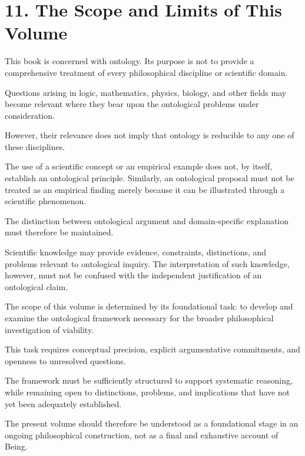 
\section*{11. The Scope and Limits of This Volume}

This book is concerned with ontology. Its purpose
is not to provide a comprehensive treatment
of every philosophical discipline or scientific
domain.

Questions arising in logic, mathematics, physics,
biology, and other fields may become relevant
where they bear upon the ontological problems
under consideration.

However, their relevance does not imply that
ontology is reducible to any one of these
disciplines.

The use of a scientific concept or an empirical
example does not, by itself, establish an
ontological principle. Similarly, an ontological
proposal must not be treated as an empirical
finding merely because it can be illustrated
through a scientific phenomenon.

The distinction between ontological argument
and domain-specific explanation must therefore
be maintained.

Scientific knowledge may provide evidence,
constraints, distinctions, and problems relevant
to ontological inquiry. The interpretation of
such knowledge, however, must not be confused
with the independent justification of an
ontological claim.

The scope of this volume is determined by
its foundational task: to develop and examine
the ontological framework necessary for the
broader philosophical investigation of viability.

This task requires conceptual precision,
explicit argumentative commitments, and
openness to unresolved questions.

The framework must be sufficiently structured
to support systematic reasoning, while remaining
open to distinctions, problems, and implications
that have not yet been adequately established.

The present volume should therefore be understood
as a foundational stage in an ongoing philosophical
construction, not as a final and exhaustive
account of Being.


